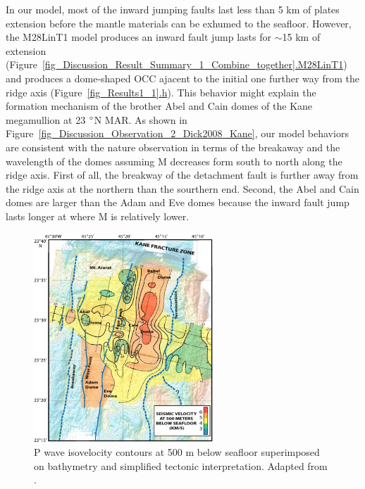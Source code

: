 In our model, most of the inward jumping faults last less than 5 km of plates extension before the mantle materials can be exhumed to the seafloor. However, the M28LinT1 model produces an inward fault jump lasts for $\sim$15 km of extension (Figure~\hyperref[fig_Discussion_Result_Summary_1_Combine_together]{\ref{fig_Discussion_Result_Summary_1_Combine_together}.M28LinT1}) and produces a dome-shaped OCC ajacent to the initial one further way from the ridge axis (Figure~\hyperref[fig_Results1_1]{\ref{fig_Results1_1}.h}). This behavior might explain the formation mechanism of the brother Abel and Cain domes of the Kane megamullion at 23 $\degree$N MAR. As shown in Figure~\hyperref[fig_Discussion_Observation_2_Dick2008_Kane]{\ref{fig_Discussion_Observation_2_Dick2008_Kane}}, our model behaviors are consistent with the nature observation in terms of the breakaway and the wavelength of the domes assuming M decreases form south to north along the ridge axis. First of all, the breakway of the detachment fault is further away from the ridge axis at the northern than the sourthern end. Second, the Abel and Cain domes are larger than the Adam and Eve domes because the inward fault jump lasts longer at where M is relatively lower.    

\begin{figure}[h]
 \centering
  \includegraphics[width=0.6\textwidth]{./Figures/fig_Discussion_Observation_1_Xu2009_SeismicV_Kane.eps}
 \caption{P wave isovelocity contours at 500 m below seafloor superimposed on bathymetry and simplified tectonic interpretation. Adapted from \citep{Xu2009}.}
 \label{fig_Discussion_Observation_1_Xu2009_SeismicV_Kane}
\end{figure}


